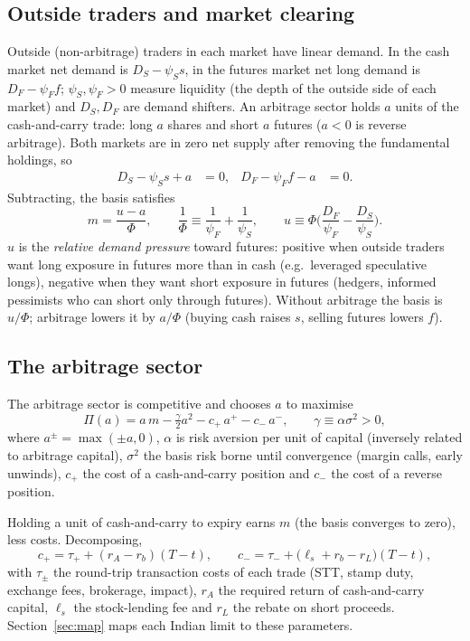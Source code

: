 \subsection{Outside traders and market clearing}
Outside (non-arbitrage) traders in each market have linear demand. In the cash market net demand is $D_S-\psi_S s$, in
the futures market net long demand is $D_F-\psi_F f$; $\psi_S,\psi_F>0$ measure liquidity (the depth of the outside
side of each market) and $D_S, D_F$ are demand shifters. An arbitrage sector holds $a$ units of the cash-and-carry
trade: long $a$ shares and short $a$ futures ($a<0$ is reverse arbitrage). Both markets are in zero net supply after
removing the fundamental holdings, so
\begin{align}
D_S-\psi_S s + a &= 0, & D_F-\psi_F f - a &= 0 .
\end{align}
Subtracting, the basis satisfies
\begin{equation}\label{eq:clear}
m=\frac{u-a}{\Phi},\qquad \frac1\Phi\equiv\frac1{\psi_F}+\frac1{\psi_S},\qquad u\equiv \Phi\Big(\frac{D_F}{\psi_F}-\frac{D_S}{\psi_S}\Big).
\end{equation}
$u$ is the \emph{relative demand pressure} toward futures: positive when outside traders want long exposure in futures
more than in cash (e.g.\ leveraged speculative longs), negative when they want short exposure in futures (hedgers,
informed pessimists who can short only through futures). Without arbitrage the basis is $u/\Phi$; arbitrage lowers it by
$a/\Phi$ (buying cash raises $s$, selling futures lowers $f$).

\subsection{The arbitrage sector}
\begin{assumption}[Arbitrage]\label{as:arb}
The arbitrage sector is competitive and chooses $a$ to maximise
\begin{equation}\label{eq:obj}
\Pi(a)= a\,m-\tfrac{\gamma}{2}a^2 - c_+\,a^+ - c_-\,a^-,\qquad \gamma\equiv\alpha\sigma^2>0,
\end{equation}
where $a^\pm=\max(\pm a,0)$, $\alpha$ is risk aversion per unit of capital (inversely related to arbitrage capital),
$\sigma^2$ the basis risk borne until convergence (margin calls, early unwinds), $c_+$ the cost of a cash-and-carry
position and $c_-$ the cost of a reverse position.
\end{assumption}
Holding a unit of cash-and-carry to expiry earns $m$ (the basis converges to zero), less costs. Decomposing,
\begin{equation}\label{eq:costs}
c_+=\tau_+ + (r_A-r_b)(T-t),\qquad c_-=\tau_- + \big(\ell_s+r_b-r_L\big)(T-t),
\end{equation}
with $\tau_\pm$ the round-trip transaction costs of each trade (STT, stamp duty, exchange fees, brokerage, impact),
$r_A$ the required return of cash-and-carry capital, $\ell_s$ the stock-lending fee and $r_L$ the rebate on short
proceeds. Section~\ref{sec:map} maps each Indian limit to these parameters.

